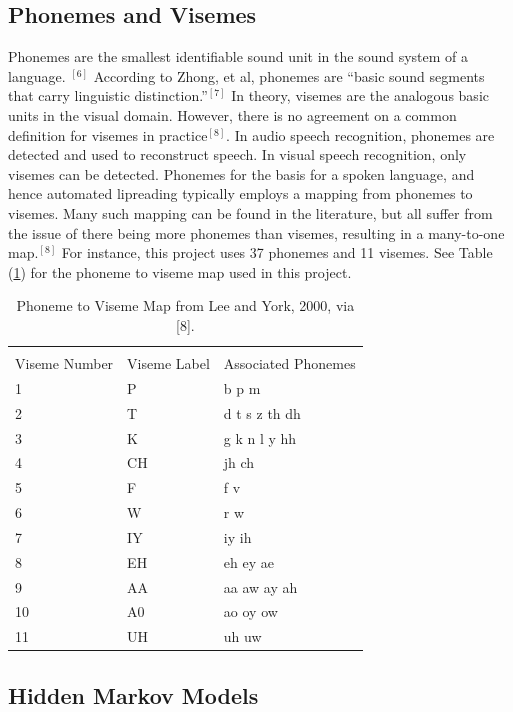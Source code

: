 \documentclass[a4paper]{article}
\begin{document}
\subsection{Phonemes and Visemes}
Phonemes are the smallest identifiable sound unit in the sound system of a language. $^{[6]}$  According to Zhong, et al, phonemes are ``basic sound segments that carry linguistic distinction.''$^{[7]}$ In theory, visemes are the analogous basic units in the visual domain.  However, there is no agreement on a common definition for visemes in practice$^{[8]}$.  In audio speech recognition, phonemes are detected and used to reconstruct speech.  In visual speech recognition, only visemes can be detected.  Phonemes for the basis for a spoken language, and hence automated lipreading typically employs a mapping from phonemes to visemes.  Many such mapping can be found in the literature, but all suffer from the issue of there being more phonemes than visemes, resulting in a many-to-one map.$^{[8]}$  For instance, this project uses 37 phonemes and 11 visemes. See Table (\ref{tab:pv}) for the phoneme to viseme map used in this project.  

\begin{table}[!hb]
\center
\caption{Phoneme to Viseme Map from Lee and York, 2000, via [8].}
\begin{tabular}{l l l}
\hline\hline\\
Viseme Number & Viseme Label & Associated Phonemes\\
 \hline
1   & P      &  b p m \\ 
2   & T      &  d t s z th dh\\
3   & K      &   g k n l y hh\\
4   & CH   &   jh ch\\
5   & F      &   f v\\
6   & W     &   r w\\
7   & IY     &   iy ih\\
8   & EH   &   eh ey ae\\
9   & AA    &   aa aw ay ah\\
10   & A0  &   ao oy ow\\
11 & UH   &   uh uw\\
\end{tabular}
\label{tab:pv}
\end{table}


\subsection{Hidden Markov Models}
\end{document}
